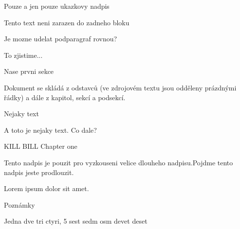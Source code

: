 

\chyph
\fontfam[Schola]\typosize[11/13]

\tit Pouze a jen pouze ukazkovy nadpis

Tento text neni zarazen do zadneho bloku

\secc Je mozne udelat podparagraf rovnou?

To zjistime...

\sec Nase prvni sekce

Dokument se skládá z odstavců (ve zdrojovém textu jsou odděleny prázdnými řádky)
a dále z kapitol, sekcí a podsekcí.

\secc Nejaky text

A toto je nejaky text.
Co dale?

\chap KILL BILL Chapter one

\secc Tento nadpis je pouzit pro ^^J
vyzkouseni velice dlouheho nadpisu.\nl Pojdme tento nadpis jeste prodlouzit.

Lorem ipsum dolor sit amet.

\secc Poznámky

Jedna dve tri ctyri, 5 sest sedm osm devet deset

\bye
